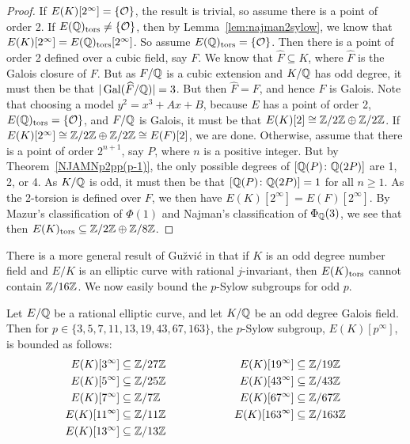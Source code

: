 \begin{proof}
If $E(K)[2^\infty]= \{ \mathcal{O} \}$, the result is trivial, so assume there is a point of order 2. If $E(\mathbb{Q})_{\text{tors}} \neq \{ \mathcal{O} \}$, then by Lemma~\ref{lem:najman2sylow}, we know that $E(K)[2^\infty]= E(\mathbb{Q})_{\text{tors}}[2^\infty]$. So assume $E(\mathbb{Q})_{\text{tors}}= \{ \mathcal{O} \}$. Then there is a point of order 2 defined over a cubic field, say $F$. We know that $\widehat{F} \subseteq K$, where $\widehat{F}$ is the Galois closure of $F$. But as $F/\mathbb{Q}$ is a cubic extension and $K/\mathbb{Q}$ has odd degree, it must then be that $|\operatorname{Gal}(\widehat{F}/\mathbb{Q})|= 3$. But then $\widehat{F}= F$, and hence $F$ is Galois. Note that choosing a model $y^2= x^3 + Ax + B$, because $E$ has a point of order 2, $E(\mathbb{Q})_{\text{tors}}= \{ \mathcal{O} \}$, and $F/\mathbb{Q}$ is Galois, it must be that $E(K)[2] \cong \mathbb{Z}/2\mathbb{Z} \oplus \mathbb{Z}/2\mathbb{Z}$. If $E(K)[2^\infty] \cong \mathbb{Z}/2\mathbb{Z} \oplus \mathbb{Z}/2\mathbb{Z} \cong E(F)[2]$, we are done. Otherwise, assume that there is a point of order $2^{n+1}$, say $P$, where $n$ is a positive integer. But by Theorem~\ref{NJAMNp2pp(p-1)}, the only possible degrees of $[\mathbb{Q}(P) \colon \mathbb{Q}(2P)]$ are 1, 2, or 4. As $K/\mathbb{Q}$ is odd, it must then be that $[\mathbb{Q}(P) \colon \mathbb{Q}(2P)]= 1$ for all $n \geq 1$. As the 2-torsion is defined over $F$, we then have $E(K)[2^\infty]= E(F)[2^\infty]$. By Mazur's classification of $\Phi(1)$ and Najman's classification of $\Phi_{\mathbb{Q}}(3)$, we see that then $E(K)_{\text{tors}} \subseteq \mathbb{Z}/2\mathbb{Z} \oplus \mathbb{Z}/8\mathbb{Z}$.
\end{proof}




There is a more general result of Gu{\u{z}}vi\'c in \cite{guzvic19} that if $K$ is an odd degree number field and $E/K$ is an elliptic curve with rational $j$-invariant, then $E(K)_{\text{tors}}$ cannot contain $\mathbb{Z}/16\mathbb{Z}$. We now easily bound the $p$-Sylow subgroups for odd $p$. 



\begin{lem} \label{lem:oddpsylowbound}
Let $E/\mathbb{Q}$ be a rational elliptic curve, and let $K/\mathbb{Q}$ be an odd degree Galois field. Then for $p \in \{ 3, 5, 7, 11, 13, 19, 43, 67, 163 \}$, the $p$-Sylow subgroup, $E(K)[p^\infty]$, is bounded as follows:
	\[
	\begin{aligned}
	E(K)[3^\infty] &\subseteq \mathbb{Z}/27\mathbb{Z} &\hspace{2cm} E(K)[19^\infty] &\subseteq \mathbb{Z}/19\mathbb{Z} \\
	E(K)[5^\infty] &\subseteq \mathbb{Z}/25\mathbb{Z} & E(K)[43^\infty] &\subseteq \mathbb{Z}/43\mathbb{Z} \\
	E(K)[7^\infty] &\subseteq \mathbb{Z}/7\mathbb{Z} & E(K)[67^\infty] &\subseteq \mathbb{Z}/67\mathbb{Z} \\
	E(K)[11^\infty] &\subseteq \mathbb{Z}/11\mathbb{Z} & E(K)[163^\infty] &\subseteq \mathbb{Z}/163\mathbb{Z} \\
	E(K)[13^\infty] &\subseteq \mathbb{Z}/13\mathbb{Z} & &
	\end{aligned}
	\]
\end{lem}

